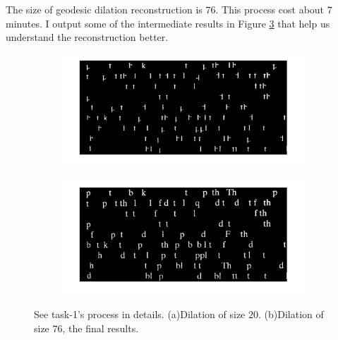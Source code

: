 The size of geodesic dilation reconstruction is $76$. This process cost about $7$ minutes. I output some of the intermediate results in Figure \ref{fig:0929append} that help us understand the reconstruction better.
\begin{figure}
	\centering
	\begin{subfigure}[b]{0.45\linewidth}
		\includegraphics[width=\linewidth]{myfigure/p8/fig0929(d20).png}
		\caption{}
		\label{fig:0929d20}
	\end{subfigure}
	\begin{subfigure}[b]{0.45\linewidth}
    	\includegraphics[width=\linewidth]{myfigure/p8/fig0929(d).png}
    	\caption{}
    	\label{fig:0929d76}
  	\end{subfigure}
	\caption{See task-1's process in details. (a)Dilation of size $20$. (b)Dilation of size $76$, the final results.}
  	\label{fig:0929append}
\end{figure}


